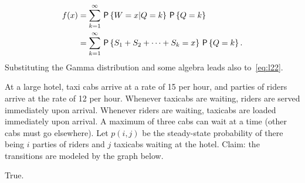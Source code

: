 \documentclass[stochastic-or.tex]{subfiles}
\begin{document}
\begin{align*}
f(x)
&= \sum_{k=1}^\infty \,\mathsf{P}\left\{W = x | Q = k\right\}\,\mathsf{P}\left\{Q = k \right\} \\
&= \sum_{k=1}^\infty \,\mathsf{P}\left\{S_1 + S_2 + \cdots + S_k = x\right\}\,\mathsf{P}\left\{Q = k \right\}.
\end{align*}
Substituting the Gamma distribution and some algebra leads also to~\cref{eq:l22}.

\begin{truefalse}
At a large hotel, taxi cabs arrive at a rate of 15 per
hour, and parties of riders arrive at the rate of 12 per
hour. Whenever taxicabs are waiting, riders are served immediately
upon arrival. Whenever riders are waiting, taxicabs are loaded
immediately upon arrival. A maximum of three cabs can wait at a time (other cabs must go elsewhere). Let $p(i,j)$ be the steady-state probability of there being $i$ parties of riders and $j$ taxicabs waiting at the hotel. Claim: the transitions are modeled by the graph below.

 \begin{center}

 \end{center}
\begin{solution}
True.
\end{solution}
\end{truefalse}
\end{document}
